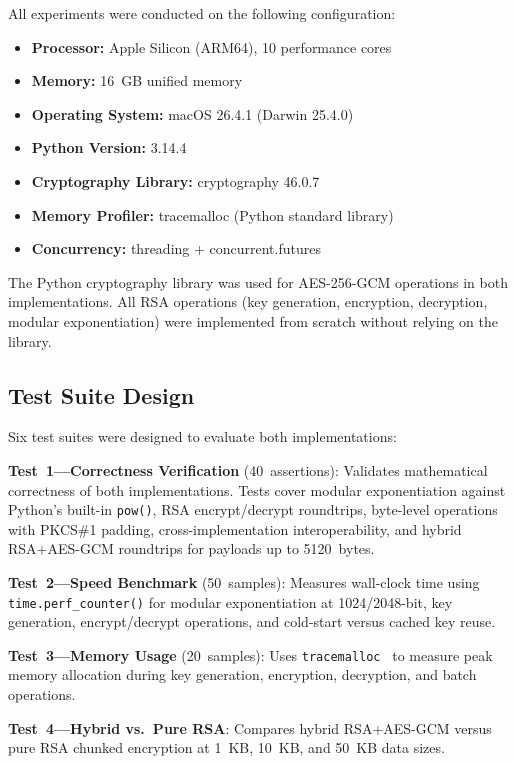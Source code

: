\documentclass[conference]{IEEEtran}
\begin{document}
All experiments were conducted on the following configuration:
\begin{itemize}
    \item \textbf{Processor:} Apple Silicon (ARM64), 10 performance cores
    \item \textbf{Memory:} 16~GB unified memory
    \item \textbf{Operating System:} macOS 26.4.1 (Darwin 25.4.0)
    \item \textbf{Python Version:} 3.14.4
    \item \textbf{Cryptography Library:} cryptography 46.0.7~\cite{cryptography_io}
    \item \textbf{Memory Profiler:} tracemalloc (Python standard library)~\cite{python_tracemalloc}
    \item \textbf{Concurrency:} threading + concurrent.futures~\cite{python_threading}
\end{itemize}

The Python cryptography library was used for AES-256-GCM operations in both implementations. All RSA operations (key generation, encryption, decryption, modular exponentiation) were implemented from scratch without relying on the library.

\subsection{Test Suite Design}

Six test suites were designed to evaluate both implementations:

\textbf{Test~1---Correctness Verification} (40~assertions): Validates mathematical correctness of both implementations. Tests cover modular exponentiation against Python's built-in \texttt{pow()}, RSA encrypt/decrypt roundtrips, byte-level operations with PKCS\#1 padding, cross-implementation interoperability, and hybrid RSA+AES-GCM roundtrips for payloads up to 5120~bytes.

\textbf{Test~2---Speed Benchmark} (50~samples): Measures wall-clock time using \texttt{time.perf\_counter()} for modular exponentiation at 1024/2048-bit, key generation, encrypt/decrypt operations, and cold-start versus cached key reuse.

\textbf{Test~3---Memory Usage} (20~samples): Uses \texttt{tracemalloc}~\cite{python_tracemalloc} to measure peak memory allocation during key generation, encryption, decryption, and batch operations.

\textbf{Test~4---Hybrid vs.\ Pure RSA}: Compares hybrid RSA+AES-GCM versus pure RSA chunked encryption at 1~KB, 10~KB, and 50~KB data sizes.
\end{document}
